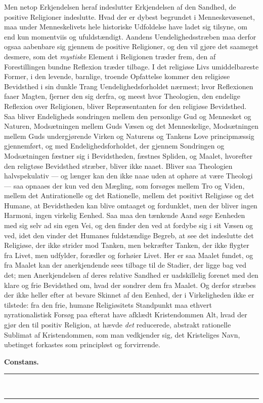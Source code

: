 \documentclass[12pt,a4paper,openany]{book}
\newcommand{\opage}[1]{\marginnote{\footnotesize\textit{[#1]}}}
\begin{document}
Men netop Erkjendelsen heraf indeslutter Erkjendelsen
af den Sandhed, de positive Religioner indeslutte. Hvad der
er dybest begrundet i Menneskevæsenet, maa under Menneskelivets
hele historiske Udfoldelse have ladet sig tilsyne, om end
kun momentviis og ufuldstændigt. Aandens Uendelighedsstræben
maa derfor ogsaa aabenbare sig gjennem de positive
Religioner, og den vil gjøre det saameget desmere, som det
\emph{mystiske} Element i Religionen træder frem, den af Forestillingen
bundne Reflexion træder tilbage. I det religiøse
Livs umiddelbareste Former, i den levende, barnlige, troende
Opfattelse kommer den religiøse Bevidsthed i sin dunkle
Trang Uendelighedsforholdet nærmest; hvor Reflexionen faaer
Magten, fjerner den sig derfra, og meest hvor Theologien,
den endelige Reflexion over Religionen, bliver Repræsentanten
for den religiøse Bevidsthed. Saa bliver Endeligheds%
\opage{510}sondringen mellem den personlige Gud og Mennesket og
Naturen, Modsætningen mellem Guds Væsen og det Menneskelige,
Modsætningen mellem Guds undergjørende Virken
og Naturens og Tankens Love principmæssig gjennemført,
og med Endelighedsforholdet, der gjennem Sondringen og
Modsætningen fæstner sig i Bevidstheden, fæstnes Spliden,
og Maalet, hvorefter den religtøse Bevidsthed stræber, bliver
ikke naaet. Bliver saa Theologien halvspekulativ — og
længer kan den ikke naae uden at ophøre at være Theologi —
saa opnaaes der kun ved den Mægling, som forsøges mellem
Tro og Viden, mellem det Antirationelle og det Rationelle,
mellem det positivt Religiøse og det Humane, at Bevidstheden
kan blive omtaaget og fordunklet, men der bliver ingen
Harmoni, ingen virkelig Eenhed. Saa maa den tænkende
Aand søge Eenheden med sig selv ad sin egen Vei, og den
finder den ved at fordybe sig i sit Væsen og ved, idet den
vinder det Humanes fuldstændige Begreb, at see det indeslutte
det Religiøse, der ikke strider mod Tanken, men bekræfter
Tanken, der ikke flygter fra Livet, men udfylder, forædler
og forhøier Livet. Her er saa Maalet fundet, og fra Maalet
kan der anerkjendende sees tilbage til de Stadier, der ligge
bag ved det; men Anerkjendelsen af deres relative Sandhed
er uadskillelig forenet med den klare og frie Bevidsthed om,
hvad der sondrer dem fra Maalet. Og derfor stræbes der
ikke heller efter at bevare Skinnet af den Eenhed, der i
Virkeligheden ikke er tilstede: fra den frie, humane Religiøsitets
Standpunkt maa ethvert nyrationalistisk Forsøg paa
efterat have afklædt Kristendommen Alt, hvad der gjør den
til positiv Religion, at hævde \emph{det} reducerede, abstrakt rationelle
Sublimat af Kristendommen, som man vedkjender sig,
det Kristeliges Navn, ubetinget forkastes som principløst og
forvirrende.

\begin{flushright}\textbf{Constans.}\end{flushright}
\begin{center}\rule{2.5cm}{0.4pt}\\[-10pt]\rule{2.5cm}{0.4pt}\end{center}
\end{document}
